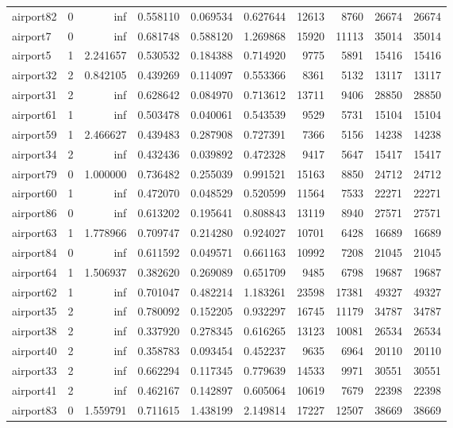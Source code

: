 \begin{longtable}{|l|r|r|r|r|r|r|r|r|r|}
airport82 & 0 & inf & 0.558110 & 0.069534 & 0.627644 & 12613 & 8760 & 26674 & 26674 \\
airport7 & 0 & inf & 0.681748 & 0.588120 & 1.269868 & 15920 & 11113 & 35014 & 35014 \\
airport5 & 1 & 2.241657 & 0.530532 & 0.184388 & 0.714920 & 9775 & 5891 & 15416 & 15416 \\
airport32 & 2 & 0.842105 & 0.439269 & 0.114097 & 0.553366 & 8361 & 5132 & 13117 & 13117 \\
airport31 & 2 & inf & 0.628642 & 0.084970 & 0.713612 & 13711 & 9406 & 28850 & 28850 \\
airport61 & 1 & inf & 0.503478 & 0.040061 & 0.543539 & 9529 & 5731 & 15104 & 15104 \\
airport59 & 1 & 2.466627 & 0.439483 & 0.287908 & 0.727391 & 7366 & 5156 & 14238 & 14238 \\
airport34 & 2 & inf & 0.432436 & 0.039892 & 0.472328 & 9417 & 5647 & 15417 & 15417 \\
airport79 & 0 & 1.000000 & 0.736482 & 0.255039 & 0.991521 & 15163 & 8850 & 24712 & 24712 \\
airport60 & 1 & inf & 0.472070 & 0.048529 & 0.520599 & 11564 & 7533 & 22271 & 22271 \\
airport86 & 0 & inf & 0.613202 & 0.195641 & 0.808843 & 13119 & 8940 & 27571 & 27571 \\
airport63 & 1 & 1.778966 & 0.709747 & 0.214280 & 0.924027 & 10701 & 6428 & 16689 & 16689 \\
airport84 & 0 & inf & 0.611592 & 0.049571 & 0.661163 & 10992 & 7208 & 21045 & 21045 \\
airport64 & 1 & 1.506937 & 0.382620 & 0.269089 & 0.651709 & 9485 & 6798 & 19687 & 19687 \\
airport62 & 1 & inf & 0.701047 & 0.482214 & 1.183261 & 23598 & 17381 & 49327 & 49327 \\
airport35 & 2 & inf & 0.780092 & 0.152205 & 0.932297 & 16745 & 11179 & 34787 & 34787 \\
airport38 & 2 & inf & 0.337920 & 0.278345 & 0.616265 & 13123 & 10081 & 26534 & 26534 \\
airport40 & 2 & inf & 0.358783 & 0.093454 & 0.452237 & 9635 & 6964 & 20110 & 20110 \\
airport33 & 2 & inf & 0.662294 & 0.117345 & 0.779639 & 14533 & 9971 & 30551 & 30551 \\
airport41 & 2 & inf & 0.462167 & 0.142897 & 0.605064 & 10619 & 7679 & 22398 & 22398 \\
airport83 & 0 & 1.559791 & 0.711615 & 1.438199 & 2.149814 & 17227 & 12507 & 38669 & 38669 \\

\end{longtable}
